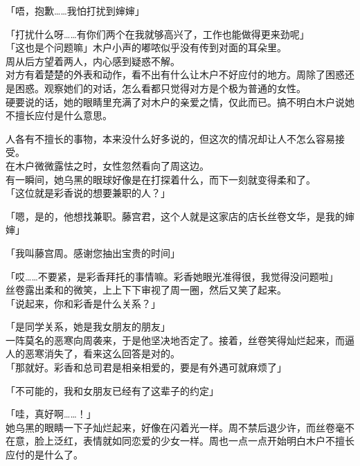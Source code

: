 「唔，抱歉……我怕打扰到婶婶」

「打扰什么呀……有你们两个在我就够高兴了，工作也能做得更来劲呢」\\

「这也是个问题嘛」木户小声的嘟哝似乎没有传到对面的耳朵里。\\

周从后方望着两人，内心感到疑惑不解。\\

对方有着楚楚的外表和动作，看不出有什么让木户不好应付的地方。周除了困惑还是困惑。观察她们的对话，怎么看都只觉得对方是个极为普通的女性。\\

硬要说的话，她的眼睛里充满了对木户的亲爱之情，仅此而已。搞不明白木户说她不擅长应付是什么意思。

人各有不擅长的事物，本来没什么好多说的，但这次的情况却让人不怎么容易接受。\\

在木户微微露怯之时，女性忽然看向了周这边。\\

有一瞬间，她乌黑的眼球好像是在打探着什么，而下一刻就变得柔和了。\\

「这位就是彩香说的想要兼职的人？」

「嗯，是的，他想找兼职。藤宫君，这个人就是这家店的店长丝卷文华，是我的婶婶」

「我叫藤宫周。感谢您抽出宝贵的时间」

「哎……不要紧，是彩香拜托的事情嘛。彩香她眼光准得很，我觉得没问题啦」\\

丝卷露出柔和的微笑，上上下下审视了周一圈，然后又笑了起来。\\

「说起来，你和彩香是什么关系？」

「是同学关系，她是我女朋友的朋友」\\

一阵莫名的恶寒向周袭来，于是他坚决地否定了。接着，丝卷笑得灿烂起来，而逼人的恶寒消失了，看来这么回答是对的。\\

「那就好。彩香和总司君是相亲相爱的，要是有外遇可就麻烦了」

「不可能的，我和女朋友已经有了这辈子的约定」

「哇，真好啊……！」\\

她乌黑的眼睛一下子灿烂起来，好像在闪着光一样。周不禁后退少许，而丝卷毫不在意，脸上泛红，表情就如同恋爱的少女一样。周也一点一点开始明白木户不擅长应付的是什么了。\\

